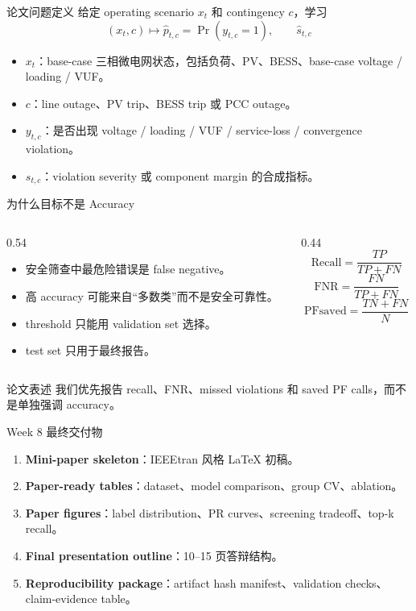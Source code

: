 \documentclass[aspectratio=169,11pt]{beamer}
\begin{document}
\begin{frame}{论文问题定义}
给定 operating scenario $x_t$ 和 contingency $c$，学习
\[
(x_t,c) \mapsto \hat p_{t,c} = \Pr(y_{t,c}=1), \qquad \hat s_{t,c}
\]
\begin{itemize}
  \item $x_t$：base-case 三相微电网状态，包括负荷、PV、BESS、base-case voltage / loading / VUF。
  \item $c$：line outage、PV trip、BESS trip 或 PCC outage。
  \item $y_{t,c}$：是否出现 voltage / loading / VUF / service-loss / convergence violation。
  \item $s_{t,c}$：violation severity 或 component margin 的合成指标。
\end{itemize}
\end{frame}

\begin{frame}{为什么目标不是 Accuracy}
\begin{columns}
\begin{column}{0.54\textwidth}
\begin{itemize}
  \item 安全筛查中最危险错误是 false negative。
  \item 高 accuracy 可能来自“多数类”而不是安全可靠性。
  \item threshold 只能用 validation set 选择。
  \item test set 只用于最终报告。
\end{itemize}
\end{column}
\begin{column}{0.44\textwidth}
\[
\mathrm{Recall}=\frac{TP}{TP+FN}
\]
\[
\mathrm{FNR}=\frac{FN}{TP+FN}
\]
\[
\mathrm{PFsaved}=\frac{TN+FN}{N}
\]
\end{column}
\end{columns}
\begin{block}{论文表述}
我们优先报告 recall、FNR、missed violations 和 saved PF calls，而不是单独强调 accuracy。
\end{block}
\end{frame}

\begin{frame}{Week 8 最终交付物}
\begin{enumerate}
  \item \textbf{Mini-paper skeleton}：IEEEtran 风格 LaTeX 初稿。
  \item \textbf{Paper-ready tables}：dataset、model comparison、group CV、ablation。
  \item \textbf{Paper figures}：label distribution、PR curves、screening tradeoff、top-k recall。
  \item \textbf{Final presentation outline}：10--15 页答辩结构。
  \item \textbf{Reproducibility package}：artifact hash manifest、validation checks、claim-evidence table。
\end{enumerate}
\end{frame}
\end{document}
